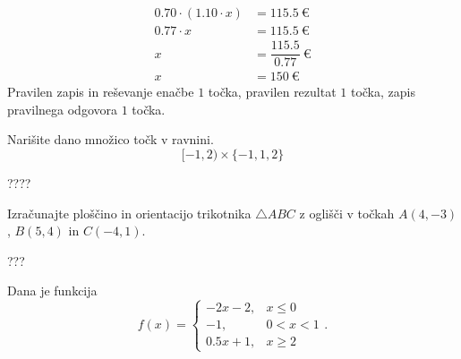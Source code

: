 \documentclass[addpoints]{exam}
\begin{document}
\begin{questions}

        \begin{solution}[2cm]
            \begin{align*}
                0.70\cdot \left(1.10\cdot x\right) &=115.5~\euro \\
                                     0.77 \cdot x &= 115.5~\euro \\
                                                x &= \dfrac{115.5}{0.77}~\euro \\
                                                x &= 150~\euro
            \end{align*}
            Pravilen zapis in reševanje enačbe $1$ točka, pravilen rezultat $1$ točka, zapis pravilnega odgovora $1$ točka.
        \end{solution}

        



    \question[4]
    Narišite dano množico točk v ravnini.
        $$[-1,2)\times \{-1,1,2\}$$

            \begin{solution}[9cm]
                ????
            \end{solution}

    
    

    \question[4]
    Izračunajte ploščino in orientacijo trikotnika $\triangle ABC$ z oglišči v točkah $A(4,-3)$, $B(5,4)$ in $C(-4,1)$.
    
    
    \begin{solution}[6cm]
        ???
    \end{solution}

        


\newpage

    \question
    Dana je funkcija $$f(x)=\begin{cases}
    -2x-2, & x\leq 0 \\ -1, & 0<x<1 \\ 0.5x+1, & x\geq 2
    \end{cases}.$$ 
    

\end{questions}
\end{document}
